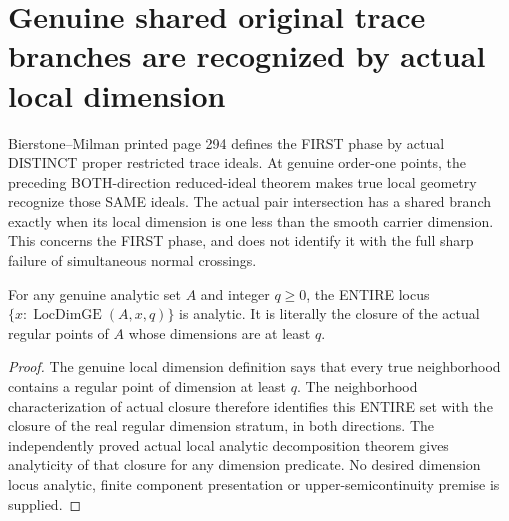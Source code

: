 \section{Genuine shared original trace branches are recognized by actual local dimension}

Bierstone--Milman printed page 294 defines the FIRST phase by actual DISTINCT
proper restricted trace ideals. At genuine order-one points, the preceding
BOTH-direction reduced-ideal theorem makes true local geometry recognize
those SAME ideals. The actual pair intersection has a shared branch exactly
when its local dimension is one less than the smooth carrier dimension.
This concerns the FIRST phase, and does not identify it with the full sharp
failure of simultaneous normal crossings.

\begin{lemma}
\label{hir:sharp-actual-local-dimension-lower-locus-analytic}
\leanok
For any genuine analytic set $A$ and integer $q\ge0$, the ENTIRE locus
$\{x:\operatorname{LocDimGE}(A,x,q)\}$ is analytic. It is literally the closure
of the actual regular points of $A$ whose dimensions are at least $q$.
\end{lemma}
\begin{proof}
The genuine local dimension definition says that every true neighborhood
contains a regular point of dimension at least $q$. The neighborhood
characterization of actual closure therefore identifies this ENTIRE set with
the closure of the real regular dimension stratum, in both directions.
The independently proved actual local analytic decomposition theorem gives
analyticity of that closure for any dimension predicate. No desired dimension
locus analytic, finite component presentation or upper-semicontinuity premise
is supplied.
\end{proof}

